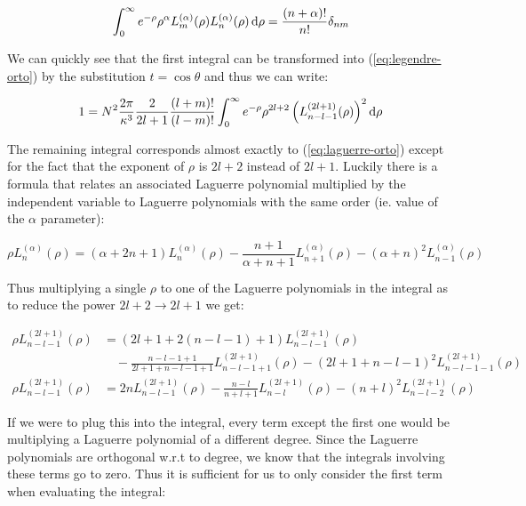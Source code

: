 \documentclass{article}
\begin{document}
    \begin{equation}
        \label{eq:laguerre-orto}
        \int_{0}^{\infty} e^{-\rho}\rho^{\alpha} L^{(\alpha)}_{m}(\rho)L^{(\alpha)}_{n}(\rho) \odif{\rho} = \frac{(n + \alpha)!}{n!}\delta_{nm}
    \end{equation}

    We can quickly see that the first integral can be transformed into (\ref{eq:legendre-orto}) by the substitution $t = \cos\theta$ and thus we can write:
    
    \begin{equation}
        1 = N^2\frac{2\pi}{\kappa^3}\frac{2}{2l + 1}\frac{(l + m)!}{(l - m)!}\int_{0}^{\infty}e^{-\rho}\rho^{2l + 2}\left(L^{(2l + 1)}_{n - l - 1}(\rho)\right)^2\odif{\rho}
    \end{equation}

    The remaining integral corresponds almost exactly to (\ref{eq:laguerre-orto}) except for the fact that the exponent of $\rho$ is $2l + 2$ instead of $2l + 1$. Luckily there is
    a formula that relates an associated Laguerre polynomial multiplied by the independent variable to Laguerre polynomials with the same order (ie. value of the $\alpha$ parameter):

    \begin{equation}
        \rho L^{(\alpha)}_{n}(\rho) = (\alpha + 2n + 1)L^{(\alpha)}_{n}(\rho) - \frac{n + 1}{\alpha + n + 1}L^{(\alpha)}_{n + 1}(\rho) - (\alpha + n)^2L^{(\alpha)}_{n - 1}(\rho)
    \end{equation}
        
    Thus multiplying a single $\rho$ to one of the Laguerre polynomials in the integral as to reduce the power $2l + 2 \to 2l + 1$ we get:

    \begin{align}
        \rho L^{(2l + 1)}_{n - l - 1}(\rho) &= (2l + 1 + 2(n - l - 1) + 1)L^{(2l + 1)}_{n - l - 1}(\rho) \\
        &\quad - \frac{n - l - 1 + 1}{2l + 1 + n - l - 1 + 1}L^{(2l + 1)}_{n - l - 1 + 1}(\rho) - (2l + 1 + n - l - 1)^2L^{(2l + 1)}_{n - l - 1 - 1}(\rho) \\[0.5em]
        \rho L^{(2l + 1)}_{n - l - 1}(\rho) &= 2nL^{(2l + 1)}_{n - l - 1}(\rho) - \frac{n - l}{n + l + 1}L^{(2l + 1)}_{n - l}(\rho) - (n + l)^2L^{(2l + 1)}_{n - l - 2}(\rho)
    \end{align}

    If we were to plug this into the integral, every term except the first one would be multiplying a Laguerre polynomial of a different degree. Since the Laguerre polynomials are orthogonal
    w.r.t to degree, we know that the integrals involving these terms go to zero. Thus it is sufficient for us to only consider the first term when evaluating the integral:
\end{document}
